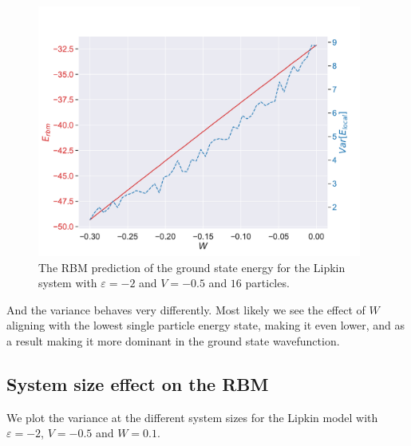 \begin{figure}[H]
  \begin{center}
    \includegraphics[width=0.95\textwidth]{Figures/Plots/Lipkin/[W][-0.3-0.0][e=850][n=16][eps=-2][V=-0.5].pdf}
  \end{center}
  \caption{The RBM prediction of the ground state energy for the Lipkin system with $\varepsilon=-2$ and $V=-0.5$ and $16$ particles.}
\end{figure}

And the variance behaves very differently. Most likely we see the effect of $W$ aligning with the lowest single particle energy state, making it even lower, and as a result making it more dominant in the ground state wavefunction. 

\subsection{System size effect on the RBM}

We plot the variance at the different system sizes for the Lipkin model with $\varepsilon =-2$, $V=-0.5$ and $W=0.1$.

